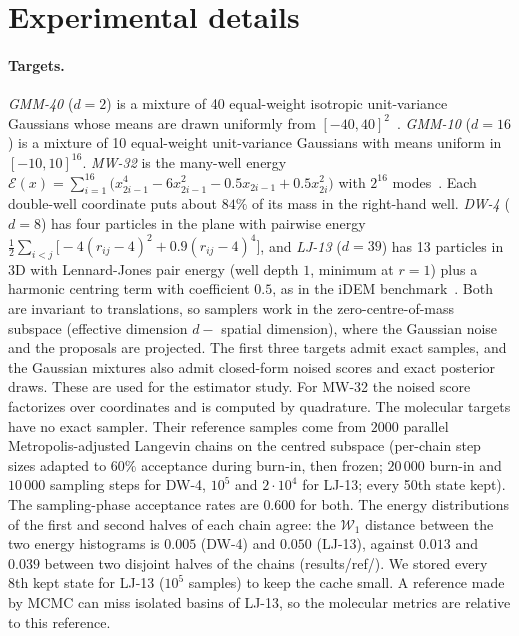 \section{Experimental details}
\label{app:exp}

\paragraph{Targets.}
\emph{GMM-40} ($d=2$) is a mixture of 40 equal-weight isotropic unit-variance Gaussians whose means are drawn uniformly from $[-40,40]^2$~\citep{midgley2023flow}.
\emph{GMM-10} ($d=16$) is a mixture of 10 equal-weight unit-variance Gaussians with means uniform in $[-10,10]^{16}$.
\emph{MW-32} is the many-well energy $\mathcal{E}(x)=\sum_{i=1}^{16}\big(x_{2i-1}^4-6x_{2i-1}^2-0.5x_{2i-1}+0.5x_{2i}^2\big)$ with $2^{16}$ modes~\citep{midgley2023flow}. Each double-well coordinate puts about $84\%$ of its mass in the right-hand well.
\emph{DW-4} ($d=8$) has four particles in the plane with pairwise energy $\frac12\sum_{i<j}\big[-4(r_{ij}-4)^2+0.9(r_{ij}-4)^4\big]$, and \emph{LJ-13} ($d=39$) has 13 particles in 3D with Lennard-Jones pair energy (well depth $1$, minimum at $r=1$) plus a harmonic centring term with coefficient $0.5$, as in the iDEM benchmark~\citep{akhound2024iterated}. Both are invariant to translations, so samplers work in the zero-centre-of-mass subspace (effective dimension $d-$ spatial dimension), where the Gaussian noise and the proposals are projected.
The first three targets admit exact samples, and the Gaussian mixtures also admit closed-form noised scores and exact posterior draws. These are used for the estimator study. For MW-32 the noised score factorizes over coordinates and is computed by quadrature.
The molecular targets have no exact sampler. Their reference samples come from $2000$ parallel Metropolis-adjusted Langevin chains on the centred subspace (per-chain step sizes adapted to $60\%$ acceptance during burn-in, then frozen; $20\,000$ burn-in and $10\,000$ sampling steps for DW-4, $10^5$ and $2\cdot10^4$ for LJ-13; every 50th state kept). The sampling-phase acceptance rates are $0.600$ for both. The energy distributions of the first and second halves of each chain agree: the $\mathcal{W}_1$ distance between the two energy histograms is $0.005$ (DW-4) and $0.050$ (LJ-13), against $0.013$ and $0.039$ between two disjoint halves of the chains (results/ref/). We stored every 8th kept state for LJ-13 ($10^5$ samples) to keep the cache small. A reference made by MCMC can miss isolated basins of LJ-13, so the molecular metrics are relative to this reference.

